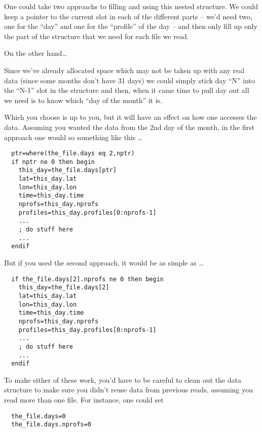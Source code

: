 One could take two approachs to filling and using this nested
structure. We could keep a pointer to the current slot in each of the
different parts -- we'd need two, one for the ``day'' and one for the
``profile'' of the day -- and then only fill up only the part of the
structure that we need for each file we read.

On the other hand\ldots 

Since we've already allocated space which may not be taken up with any
real data (since some months don't have 31 days) we could simply stick
day ``N'' into the ``N-1'' slot in the structure and then, when it
came time to pull day out all we need is to know which ``day of the
month'' it is.

Which you choose is up to you, but it will have an effect on how one
accesses the data. Assuming you wanted the data from the 2nd day of
the month, in the first approach one would so something like this \ldots

\begin{IDLExample}\begin{verbatim}
  ptr=where(the_file.days eq 2,nptr)
  if nptr ne 0 then begin 
    this_day=the_file.days[ptr]
    lat=this_day.lat
    lon=this_day.lon
    time=this_day.time
    nprofs=this_day.nprofs
    profiles=this_day.profiles[0:nprofs-1]
    ... 
    ; do stuff here 
    ...
  endif 
\end{verbatim}\end{IDLExample}


But if you used the second approach, it would be as simple as \ldots

\begin{IDLExample}\begin{verbatim}
  if the_file.days[2].nprofs ne 0 then begin 
    this_day=the_file.days[2]
    lat=this_day.lat
    lon=this_day.lon
    time=this_day.time
    nprofs=this_day.nprofs
    profiles=this_day.profiles[0:nprofs-1]
    ... 
    ; do stuff here 
    ...
  endif 
\end{verbatim}\end{IDLExample}

To make either of these work, you'd have to be careful to clean out
the data structure to make sure you didn't reuse data from previous
reads, assuming you read more than one file. For instance, one could
set

\begin{IDLExample}\begin{verbatim}
  the_file.days=0
  the_file.days.nprofs=0
\end{verbatim}\end{IDLExample}

